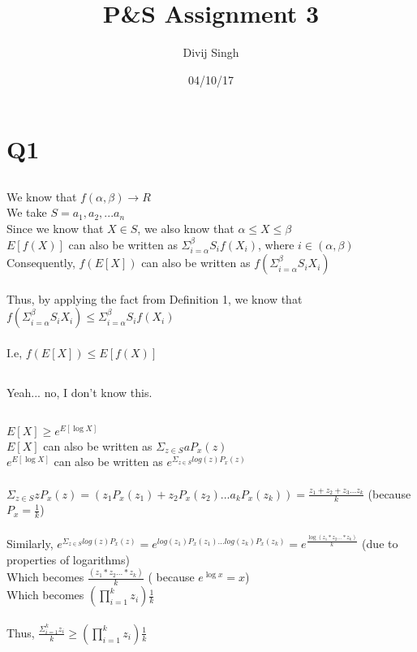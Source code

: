 \documentclass{article}
\title{P\&S Assignment 3}
\date{04/10/17}
\author{Divij Singh}
\begin{document}
	\maketitle
	
	\section{Q1}
	
	\subsection{}
		We know that $f(\alpha,\beta) \rightarrow R$\\
		We take $S = a_1,a_2,...a_n$\\
		Since we know that $X \in S$, we also know that $\alpha \le X \le \beta$\\
		$E[f(X)]$ can also be written as $\Sigma_{i=\alpha}^{\beta}  S_i f (X_i)$, where $i \in (\alpha,\beta)$\\
		Consequently, $f(E[X])$ can also be written as $f(\Sigma_{i=\alpha}^{\beta} S_i X_i)$\\
		\\
		Thus, by applying the fact from Definition 1, we know that\\ $f(\Sigma_{i=\alpha}^{\beta} S_i X_i) \le \Sigma_{i=\alpha}^{\beta}  S_i f (X_i)$\\
		\\
		I.e, $f(E[X]) \le E[f(X)]$
	\subsection{}
		Yeah... no, I don't know this.
	\subsection{}
		$E[X] \ge e^{E[\log X]}$\\
		$E[X]$ can also be written as $\Sigma_{z \in S} aP_x (z)$\\
		$e^{E[\log X]}$ can also be written as $e^{\Sigma_{z \in S} log(z)P_x (z)}$\\
		\\
		$\Sigma_{z \in S} zP_x (z) = (z_1 P_x(z_1) + z_2 P_x(z_2)... a_k P_x(z_k)) = \frac{z_1 + z_2 + z_3 ... z_k}{k}$ (because $P_x = \frac{1}{k}$)\\
		\\
		Similarly, $e^{\Sigma_{z \in S} log(z)P_x (z)} = e^{log(z_1)P_x(z_1) ... log(z_k)P_x(z_k)} = e^{\frac{\log (z_1 *z_2 ... * z_k)}{k}}$ (due to properties of logarithms)\\
		Which becomes $\frac{(z_1 *z_2 ...* z_k)}{k}$ ( because $e^{\log x} = x$)\\
		Which becomes $(\prod^{k}_{i=1} z_i) \frac{1}{k}$\\
		\\
		Thus, $\frac{\Sigma^{k}_{i=1} z_i}{k} \ge (\prod^{k}_{i=1} z_i) \frac{1}{k}$
	
		
\end{document}
